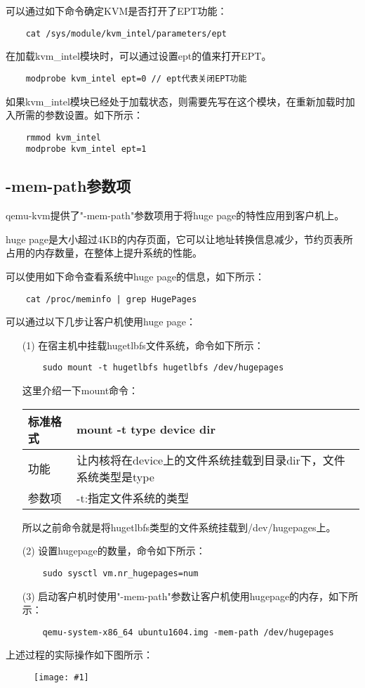 \documentclass[a4paper,left=2.5cm,right=2.5cm,11pt]{article}
\newcommand{\fic}[1]{\begin{figure}[H]
		\center
		\texttt{[image: \#1]}
	\end{figure}}
\newcommand{\interval}{\vspace{0.5em}}
\begin{document}
	可以通过如下命令确定KVM是否打开了EPT功能：
	\begin{lstlisting}
	cat /sys/module/kvm_intel/parameters/ept
	\end{lstlisting}

	在加载kvm\_intel模块时，可以通过设置ept的值来打开EPT。
	\begin{lstlisting}
	modprobe kvm_intel ept=0 // ept代表关闭EPT功能
	\end{lstlisting}

	如果kvm\_intel模块已经处于加载状态，则需要先写在这个模块，在重新加载时加入所需的参数设置。如下所示：
	\begin{lstlisting}
	rmmod kvm_intel
	modprobe kvm_intel ept=1
	\end{lstlisting}

\subsection{-mem-path参数项}
	qemu-kvm提供了"-mem-path"参数项用于将huge page的特性应用到客户机上。\par
	huge page是大小超过4KB的内存页面，它可以让地址转换信息减少，节约页表所占用的内存数量，在整体上提升系统的性能。\par
	可以使用如下命令查看系统中huge page的信息，如下所示：
	\begin{lstlisting}
	cat /proc/meminfo | grep HugePages
	\end{lstlisting}

	可以通过以下几步让客户机使用huge page：
	\begin{itemize}
		\item[(1)] 在宿主机中挂载hugetlbfs文件系统，命令如下所示：
		\begin{lstlisting}
	sudo mount -t hugetlbfs hugetlbfs /dev/hugepages
		\end{lstlisting}

		这里介绍一下mount命令：
		\interval
		\begin{longtable}{p{2cm}p{8cm}}
		\hline
		标准格式 & mount -t type device dir \\
		\hline
		功能 & 让内核将在device上的文件系统挂载到目录dir下，文件系统类型是type \\
		\hline
		参数项 & -t:指定文件系统的类型 \\
		\hline
		\end{longtable}
		\interval

		所以之前命令就是将hugetlbfs类型的文件系统挂载到/dev/hugepages上。

		\item[(2)] 设置hugepage的数量，命令如下所示：
		\begin{lstlisting}
	sudo sysctl vm.nr_hugepages=num
		\end{lstlisting}

		\item[(3)] 启动客户机时使用"-mem-path"参数让客户机使用hugepage的内存，如下所示：
		\begin{lstlisting}
	qemu-system-x86_64 ubuntu1604.img -mem-path /dev/hugepages
		\end{lstlisting}
	\end{itemize}

	上述过程的实际操作如下图所示：
	\fic{11.png}
\end{document}
